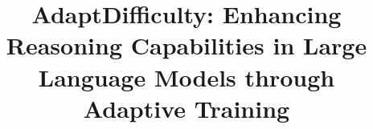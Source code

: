 \documentclass[]{bytedance_seed}
\title{AdaptDifficulty: Enhancing Reasoning Capabilities in Large Language Models through Adaptive Training}
\affiliation{Zhijiang Lab, Hangzhou, China}
\begin{document}
\maketitle





%





% 




\clearpage


% 


\clearpage
\beginappendix

\end{document}
